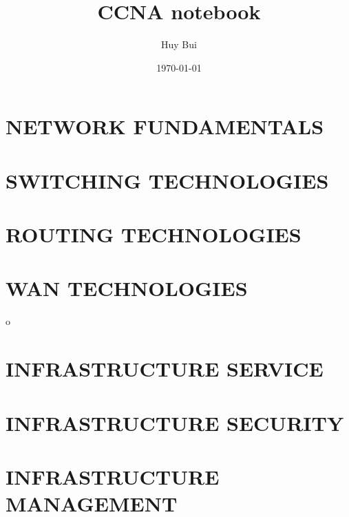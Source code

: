 \documentclass[10pt]{book}
\author{Huy Bui}
\title{CCNA notebook}
\date{\today}
\theoremstyle{definition}
\begin{document}
\thispagestyle{empty}{\tableofcontents}
\listoffigures
\listoftables

\part{NETWORK FUNDAMENTALS}




\part{SWITCHING TECHNOLOGIES}






\part{ROUTING TECHNOLOGIES}






\part{WAN TECHNOLOGIES}


o

\part{INFRASTRUCTURE SERVICE}



\part{INFRASTRUCTURE SECURITY}



\part{INFRASTRUCTURE MANAGEMENT}




\end{document}
